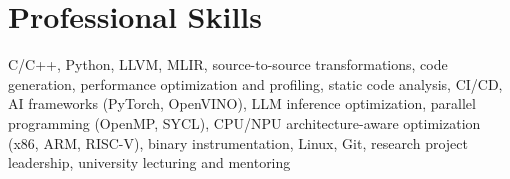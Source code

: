 \documentclass[11pt,a4paper]{article}
\begin{document}
\section*{Professional Skills}
\small
C/C++, %
Python, %
LLVM, %
MLIR, %
source-to-source transformations, %
code generation, %
performance optimization and profiling, %
static code analysis, %
CI/CD, %
AI frameworks (PyTorch, OpenVINO), %
LLM inference optimization, %
parallel programming (OpenMP, SYCL), %
CPU/NPU architecture-aware optimization (x86, ARM, RISC-V), %
binary instrumentation, %
Linux, %
Git, %
research project leadership, %
university lecturing and mentoring
\end{document}
